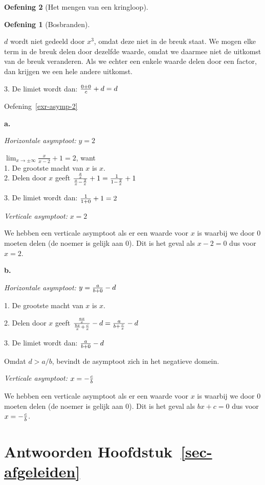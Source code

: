 \documentclass[
  a4paper,
]{scrbook}
\theoremstyle{definition}
\newtheorem{exercise}{Oefening}[chapter]
\theoremstyle{remark}
\begin{document}
\begin{exercise}[Het mengen van een
kringloop]
\begin{exercise}[Bosbranden]
\begin{tcolorbox}
\(d\) wordt niet gedeeld door \(x^3\), omdat deze niet in de breuk
staat. \textbar{} We mogen elke term in de breuk delen door dezelfde
waarde, omdat we daarmee niet de uitkomst van de breuk veranderen. Als
we echter een enkele waarde delen door een factor, dan krijgen we een
hele andere uitkomst.

\end{tcolorbox}

3. De limiet wordt dan: \({0+0 \over c}+d = d\)

Oefening~\ref{exr-asymp-2}

\textbf{a.}

\emph{Horizontale asymptoot:} \(y=2\)

\(\lim_{x\to\pm\infty} \frac{x}{x-2}+1=2\), want\\
1. De grootste macht van \(x\) is \(x\).\\
2. Delen door \(x\) geeft
\({{x \over x} \over {x \over x}-{2 \over x}} + 1 = {1 \over 1-{2 \over x}} + 1\)

3. De limiet wordt dan: \({1 \over 1 + 0} + 1 = 2\)

\emph{Verticale asymptoot:} \(x=2\)

We hebben een verticale asymptoot als er een waarde voor \(x\) is
waarbij we door 0 moeten delen (de noemer is gelijk aan 0). Dit is het
geval als \(x-2=0\) dus voor \(x=2\).

\textbf{b.}

\emph{Horizontale asymptoot:} \(y={a \over b+0} - d\)

1. De grootste macht van \(x\) is \(x\).

2. Delen door \(x\) geeft
\({{ax \over x} \over {bx \over x}+{c \over x}} - d = {a \over b+{c \over x}} - d\)

3. De limiet wordt dan: \({a \over b+0} - d\)

Omdat \(d > a/b\), bevindt de asymptoot zich in het negatieve domein.

\emph{Verticale asymptoot:} \(x=-{c \over b}\)

We hebben een verticale asymptoot als er een waarde voor \(x\) is
waarbij we door 0 moeten delen (de noemer is gelijk aan 0). Dit is het
geval als \(bx+c=0\) dus voor \(x=-{c \over b}\).

\section*{\texorpdfstring{Antwoorden
Hoofdstuk~\ref{sec-afgeleiden}}{Antwoorden Hoofdstuk~}}\label{antwoorden-sec-afgeleiden}


\end{exercise}
\end{exercise}
\end{document}

